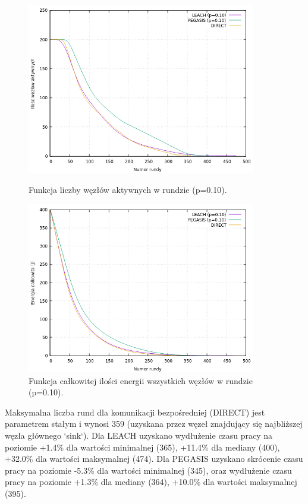 \documentclass[a4paper,12pt,twoside,openany]{report}
\begin{document}
\begin{figure}[H]
 \centering
 \includegraphics[width=10cm]{images/gnuplot/test_4/nodes_in_round_p010.png}
 \caption{Funkcja liczby węzłów aktywnych w rundzie (p=0.10).}
 \includegraphics[width=10cm]{images/gnuplot/test_4/energy_in_round_p010.png}
 \caption{Funkcja całkowitej ilości energii wszystkich węzłów w rundzie (p=0.10).}
\end{figure}

\par
Maksymalna liczba rund dla komunikacji bezpośredniej (DIRECT) jest parametrem stałym i wynosi 359 (uzyskana przez węzeł znajdujący się najbliższej węzła głównego `sink`).
Dla LEACH uzyskano wydłużenie czasu pracy na poziomie +1.4\% dla wartości minimalnej (365), +11.4\% dla mediany (400), +32.0\% dla wartości maksymalnej (474).
Dla PEGASIS uzyskano skrócenie czasu pracy na poziomie -5.3\% dla wartości minimalnej (345), oraz wydłużenie czasu pracy na poziomie +1.3\% dla mediany (364), +10.0\% dla wartości maksymalnej (395).
\end{document}
